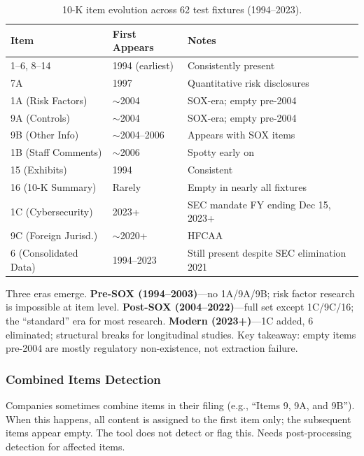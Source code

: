 \documentclass[11pt]{article}
\begin{document}
\begin{table}[h]
\centering
\begin{tabular}{lll}
\toprule
Item & First Appears & Notes \\
\midrule
1--6, 8--14          & 1994 (earliest)  & Consistently present \\
7A                   & 1997             & Quantitative risk disclosures \\
1A (Risk Factors)    & $\sim$2004       & SOX-era; empty pre-2004 \\
9A (Controls)        & $\sim$2004       & SOX-era; empty pre-2004 \\
9B (Other Info)      & $\sim$2004--2006 & Appears with SOX items \\
1B (Staff Comments)  & $\sim$2006       & Spotty early on \\
15 (Exhibits)        & 1994             & Consistent \\
16 (10-K Summary)    & Rarely           & Empty in nearly all fixtures \\
1C (Cybersecurity)   & 2023+            & SEC mandate FY ending Dec 15, 2023+ \\
9C (Foreign Jurisd.) & $\sim$2020+      & HFCAA \\
6 (Consolidated Data)& 1994--2023       & Still present despite SEC elimination 2021 \\
\bottomrule
\end{tabular}
\caption{10-K item evolution across 62 test fixtures (1994--2023).}
\end{table}

Three eras emerge. \textbf{Pre-SOX (1994--2003)}---no 1A/9A/9B; risk factor
research is impossible at item level. \textbf{Post-SOX (2004--2022)}---full set
except 1C/9C/16; the ``standard'' era for most research. \textbf{Modern
(2023+)}---1C added, 6 eliminated; structural breaks for longitudinal studies.
Key takeaway: empty items pre-2004 are mostly regulatory non-existence, not
extraction failure.

\subsubsection{Combined Items Detection}

Companies sometimes combine items in their filing (e.g., ``Items 9, 9A, and
9B''). When this happens, all content is assigned to the first item only; the
subsequent items appear empty. The tool does not detect or flag this. Needs
post-processing detection for affected items.
\end{document}
